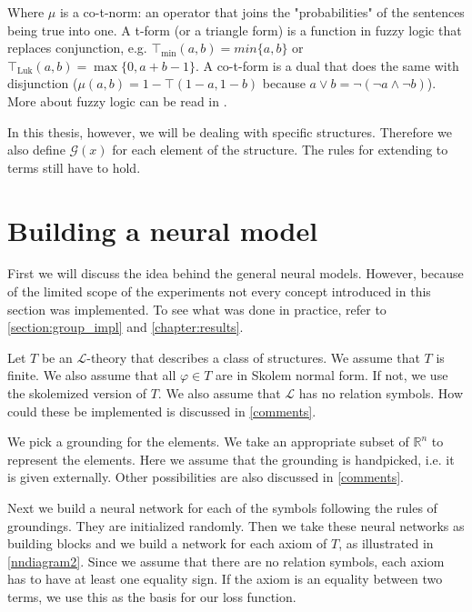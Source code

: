 Where $\mu$ is a co-t-norm: an operator that joins the "probabilities" of the sentences being true into one. A t-form (or a triangle form) is a function in fuzzy logic that replaces conjunction, e.g. $\top_{\min}(a,b)=min\{a,b\}$ or $\top_{\text{Luk}}(a,b)=\max\{0,a+b-1\}$. A co-t-form is a dual that does the same with disjunction ($\mu(a,b)=1-\top(1-a,1-b)$ because $a\vee b = \neg(\neg a\wedge \neg b)$). More about fuzzy logic can be read in \cite{fuzzy}.

In this thesis, however, we will be dealing with specific structures. Therefore we also define $\mathcal{G}(x)$ for each element of the structure. The rules for extending to terms still have to hold. 

\section{Building a neural model}

First we will discuss the idea behind the general neural models. However, because of the limited scope of the experiments not every concept introduced in this section was implemented. To see what was done in practice, refer to \autoref{section:group_impl} and \autoref{chapter:results}.

Let $T$ be an $\mathcal{L}$-theory that describes a class of structures. We assume that $T$ is finite. We also assume that all $\varphi\in T$ are in Skolem normal form. If not, we use the skolemized version of $T$. We also assume that $\mathcal{L}$ has no relation symbols. How could these be implemented is discussed in \autoref{comments}.

We pick a grounding for the elements. We take an appropriate subset of $\mathbb{R}^n$ to represent the elements. Here we assume that the grounding is handpicked, i.e. it is given externally. Other possibilities are also discussed in \autoref{comments}.

Next we build a neural network for each of the symbols following the rules of groundings. They are initialized randomly. Then we take these neural networks as building blocks and we build a network 
for each axiom of $T$, as illustrated in \autoref{nndiagram2}. Since we assume that there are no relation symbols, each axiom has to have at least one equality sign. If the axiom is an equality between two terms, we use this as the basis for our loss function.

